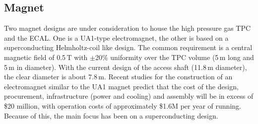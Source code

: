 \subsection{Magnet}
%
Two magnet designs are under consideration to house the high pressure gas TPC and the ECAL. One is a UA1-type electromagnet, the other is based on a superconducting Helmholtz-coil like design. The common requirement is a central magnetic field of 0.5\,T with $\pm$20\% uniformity over the TPC volume (5\,m long and 5\,m in diameter). With the current design of the access shaft (11.8\,m diameter), the clear diameter is about 7.8\,m. Recent studies for the construction of an electromagnet similar to the UA1 magnet predict that the cost of the design, procurement, infrastructure (power and cooling) and assembly will be in excess of \$20 million, with operation costs of approximately \$1.6M per year of running.  Because of this, the main focus has been on a superconducting design.
%

